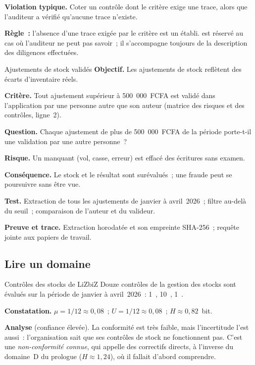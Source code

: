 \begin{boxalert}
\textbf{Violation typique.} Coter \NEK{} un contrôle dont le critère exige une
trace, alors que l'auditeur a vérifié qu'aucune trace n'existe.

\smallskip
\textbf{Règle~:} l'absence d'une trace exigée par le critère est un \NON{}
établi. \NEK{} est réservé au cas où l'auditeur ne peut pas savoir~; il
s'accompagne toujours de la description des diligences effectuées.
\end{boxalert}

\begin{boxobjet}{Ajustements de stock validés}
\textbf{Objectif.} Les ajustements de stock reflètent des écarts
d'inventaire réels.

\textbf{Critère.} Tout ajustement supérieur à 500~000~FCFA est validé dans
l'application par une personne autre que son auteur (matrice des risques et
des contrôles, ligne~2).

\textbf{Question.} Chaque ajustement de plus de 500~000~FCFA de la période
porte-t-il une validation par une autre personne~?

\textbf{Risque.} Un manquant (vol, casse, erreur) est effacé des écritures
sans examen.

\textbf{Conséquence.} Le stock et le résultat sont surévalués~; une fraude
peut se poursuivre sans être vue.

\textbf{Test.} Extraction de tous les ajustements de janvier à avril~2026~;
filtre au-delà du seuil~; comparaison de l'auteur et du valideur.

\textbf{Preuve et trace.} Extraction horodatée et son empreinte SHA-256~;
requête jointe aux papiers de travail.
\end{boxobjet}

\subsection{Lire un domaine}

\begin{boxlecture}{Contrôles des stocks de LiZbiZ}
Douze contrôles de la gestion des stocks sont évalués sur la période de
janvier à avril~2026~: 1~\OUI{}, 10~\NON{}, 1~\NEK{}.

\medskip
\textbf{Constatation.} $\mu = 1/12 \approx 0{,}08$~; $U = 1/12 \approx 0{,}08$~;
$H \approx 0{,}82$~bit.

\medskip
\textbf{Analyse} (confiance élevée). La conformité est très faible, mais
l'incertitude l'est aussi~: l'organisation sait que ses contrôles de stock
ne fonctionnent pas. C'est une \emph{non-conformité connue}, qui appelle des
correctifs directs, à l'inverse du domaine~D du prologue ($H \approx 1{,}24$),
où il fallait d'abord comprendre.

\medskip
\hfill{}
\end{boxlecture}

